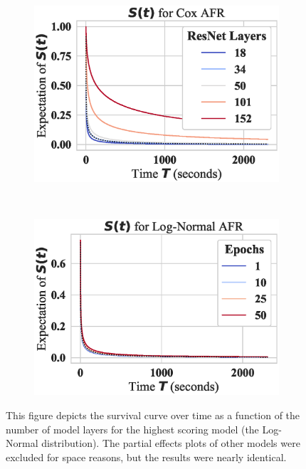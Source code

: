 \begin{figure}
    \begin{subfigure}[t]{0.5\textwidth}
        \centering\includegraphics[width=\textwidth]{cifar/log_normal_layers_partial_effect.eps}
        
    \end{subfigure}
    ~
    \begin{subfigure}[t]{0.5\textwidth}
        \centering\includegraphics[width=\textwidth]{cifar/log_normal_epochs_partial_effect.eps}
    \end{subfigure}
        \label{fig:mnist/epochs}
    
    \caption{This figure depicts the survival curve over time as a function of the number of model layers for the highest scoring model (the Log-Normal distribution). The partial effects plots of other models were excluded for space reasons, but the results were nearly identical.}
\end{figure}

